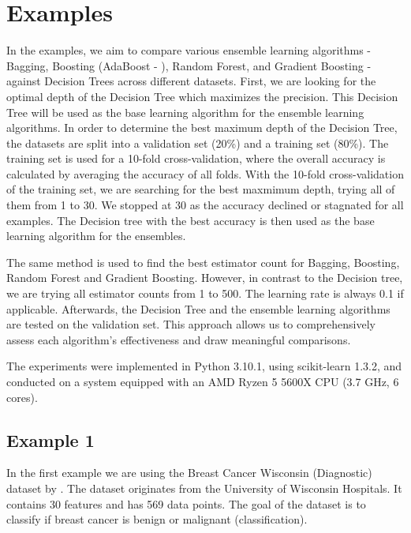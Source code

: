\section{Examples}
In the examples, we aim to compare various ensemble learning algorithms - Bagging, 
Boosting (AdaBoost - \citet{freund1996experiments}), Random Forest, and Gradient 
Boosting - against Decision Trees across different datasets.
First, we are looking for the optimal depth of the Decision Tree which maximizes the 
precision. This Decision Tree will be used as the base learning algorithm for 
the ensemble learning algorithms.
In order to determine the best maximum depth of the Decision Tree, the datasets are 
split into a validation set (20\%) and a training set (80\%). The training set is used
for a 10-fold cross-validation, where the overall accuracy is calculated by averaging the 
accuracy of all folds. With the 10-fold cross-validation of the training set, we are
searching for the best maxmimum depth, trying all of them from 1 to 30. We stopped at
30 as the accuracy declined or stagnated for all examples. The Decision tree with the
best accuracy is then used as the base learning algorithm for the ensembles.


The same method is used to find the best estimator count for Bagging, Boosting, 
Random Forest and Gradient Boosting. However, in contrast to the Decision tree,
we are trying all estimator counts from 1 to 500.
The learning rate is always 0.1 if applicable. Afterwards, the Decision Tree and
the ensemble learning algorithms are tested on the validation set.
This approach allows us to comprehensively assess each algorithm's effectiveness
and draw meaningful comparisons.


The experiments were implemented in Python 3.10.1, using scikit-learn 1.3.2, and
conducted on a system equipped with an AMD Ryzen 5 5600X CPU (3.7 GHz, 6 cores).

\newpage %
\subsection{Example 1}
\label{sec:example1}

In the first example we are using the Breast Cancer Wisconsin (Diagnostic)
dataset by \citet*{breast_cancer_wisconsin}. The dataset originates from
the University of Wisconsin Hospitals. It contains 30 features and has 569
data points. The goal of the dataset is to classify if breast cancer
is benign or malignant (classification).

